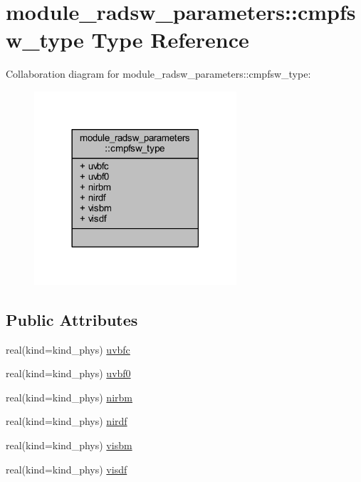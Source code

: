 \hypertarget{structmodule__radsw__parameters_1_1cmpfsw__type}{}\section{module\+\_\+radsw\+\_\+parameters\+:\+:cmpfsw\+\_\+type Type Reference}
\label{structmodule__radsw__parameters_1_1cmpfsw__type}


Collaboration diagram for module\+\_\+radsw\+\_\+parameters\+:\+:cmpfsw\+\_\+type\+:\nopagebreak
\begin{figure}[H]
\begin{center}
\leavevmode
\includegraphics[width=213pt]{structmodule__radsw__parameters_1_1cmpfsw__type__coll__graph}
\end{center}
\end{figure}
\subsection*{Public Attributes}
\begin{DoxyCompactItemize}
\item 
real(kind=kind\+\_\+phys) \hyperlink{structmodule__radsw__parameters_1_1cmpfsw__type_a7b0ac40e0ceb2ce82b6b95a614542b4f}{uvbfc}
\item 
real(kind=kind\+\_\+phys) \hyperlink{structmodule__radsw__parameters_1_1cmpfsw__type_a9e9e74c17ad3aa0a1c280f1eae513b22}{uvbf0}
\item 
real(kind=kind\+\_\+phys) \hyperlink{structmodule__radsw__parameters_1_1cmpfsw__type_aae8070f9f477bf036071ccc7d707693d}{nirbm}
\item 
real(kind=kind\+\_\+phys) \hyperlink{structmodule__radsw__parameters_1_1cmpfsw__type_a9944f87ce40eb678e3ca1d88b1dbb797}{nirdf}
\item 
real(kind=kind\+\_\+phys) \hyperlink{structmodule__radsw__parameters_1_1cmpfsw__type_aabfae10580f53c63900c74261b1b219c}{visbm}
\item 
real(kind=kind\+\_\+phys) \hyperlink{structmodule__radsw__parameters_1_1cmpfsw__type_a3eb91eab30abc0f1f1bb05c5447cede5}{visdf}
\end{DoxyCompactItemize}


